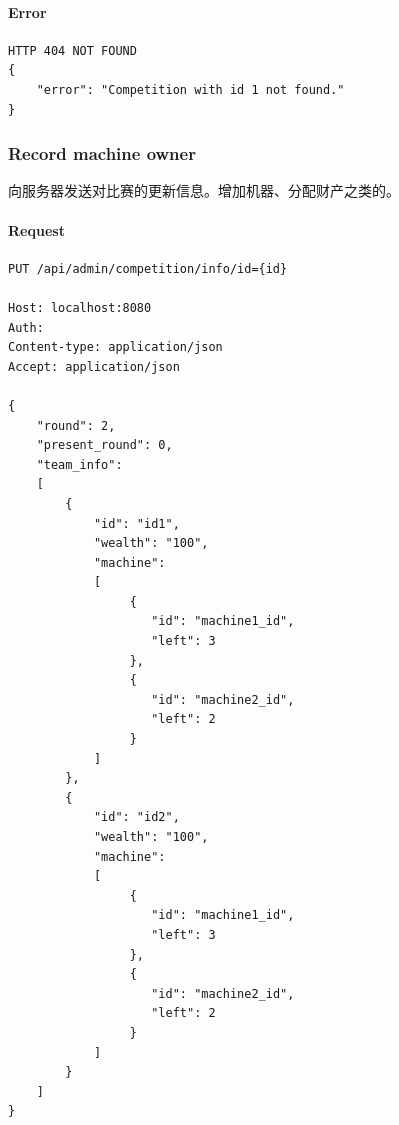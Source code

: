 \documentclass{article}
\begin{document}
\paragraph*{Error}
\begin{lstlisting}
HTTP 404 NOT FOUND
{
    "error": "Competition with id 1 not found."
}
\end{lstlisting}

\subsubsection{Record machine owner}
向服务器发送对比赛的更新信息。增加机器、分配财产之类的。

\paragraph*{Request}
\begin{lstlisting}
PUT /api/admin/competition/info/id={id}

Host: localhost:8080
Auth:
Content-type: application/json
Accept: application/json

{
    "round": 2,
    "present_round": 0,
    "team_info":
    [
        {
            "id": "id1",
            "wealth": "100",
            "machine":
            [
                 {
                    "id": "machine1_id",
                    "left": 3
                 },
                 {
                    "id": "machine2_id",
                    "left": 2
                 }
            ]
        },
        {
            "id": "id2",
            "wealth": "100",
            "machine":
            [
                 {
                    "id": "machine1_id",
                    "left": 3
                 },
                 {
                    "id": "machine2_id",
                    "left": 2
                 }
            ]
        }
    ]
}
\end{lstlisting}
\end{document}

